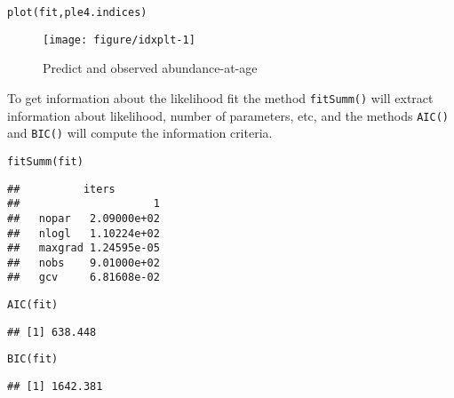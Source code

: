 \documentclass[a4paper,english,10pt]{article}\usepackage[]{graphicx}\usepackage[]{color}
\makeatletter
\def\maxwidth{ %
  \ifdim\Gin@nat@width>\linewidth
    \linewidth
  \else
    \Gin@nat@width
  \fi
}
\newcommand{\hlstd}[1]{\textcolor[rgb]{0,0,0}{#1}}%
\newcommand{\hlkwd}[1]{\textcolor[rgb]{0.361,0.506,0.596}{#1}}%
\newenvironment{kframe}{%
 \def\at@end@of@kframe{}%
 \ifinner\ifhmode%
  \def\at@end@of@kframe{\end{minipage}}%
  \begin{minipage}{\columnwidth}%
 \fi\fi%
 \def\FrameCommand##1{\hskip\@totalleftmargin \hskip-\fboxsep
 \colorbox{shadecolor}{##1}\hskip-\fboxsep
     \hskip-\linewidth \hskip-\@totalleftmargin \hskip\columnwidth}%
 \MakeFramed {\advance\hsize-\width
   \@totalleftmargin\z@ \linewidth\hsize
   \@setminipage}}%
 {\par\unskip\endMakeFramed%
 \at@end@of@kframe}
\newenvironment{knitrout}{}{} %
\newcommand{\code}[1]{{\texttt{#1}}}
\makeatother
\begin{document}
\begin{knitrout}
\color{fgcolor}\begin{kframe}
\begin{alltt}
\hlkwd{plot}\hlstd{(fit, ple4.indices)}
\end{alltt}
\end{kframe}\begin{figure}[H]

{\centering \texttt{[image: figure/idxplt-1]} 

}

\caption[Predict and observed abundance-at-age]{Predict and observed abundance-at-age\label{fig:idxplt}}
\end{figure}


\end{knitrout}



To get information about the likelihood fit the method \code{fitSumm()} will extract information about likelihood, number of parameters, etc, and the methods \code{AIC()} and \code{BIC()} will compute the information criteria.

\begin{knitrout}
\color{fgcolor}\begin{kframe}
\begin{alltt}
\hlkwd{fitSumm}\hlstd{(fit)}
\end{alltt}
\begin{verbatim}
##          iters
##                     1
##   nopar   2.09000e+02
##   nlogl   1.10224e+02
##   maxgrad 1.24595e-05
##   nobs    9.01000e+02
##   gcv     6.81608e-02
\end{verbatim}
\begin{alltt}
\hlkwd{AIC}\hlstd{(fit)}
\end{alltt}
\begin{verbatim}
## [1] 638.448
\end{verbatim}
\begin{alltt}
\hlkwd{BIC}\hlstd{(fit)}
\end{alltt}
\begin{verbatim}
## [1] 1642.381
\end{verbatim}
\end{kframe}
\end{knitrout}
\end{document}
